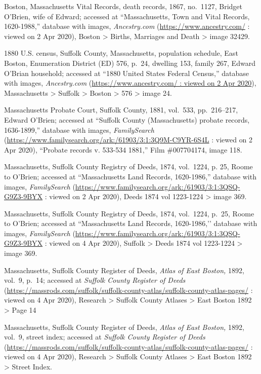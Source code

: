 \begin{thebibliography}{999}
	Boston, Massachusetts Vital Records, death records, 1867, no.\ 1127, Bridget O'Brien, wife of Edward; accessed at ``Massachusetts, Town and Vital Records, 1620-1988,'' database with images, \textit{Ancestry.com} (\url{https://www.ancestry.com/} : viewed on 2 Apr 2020), Boston > Births, Marriages and Death > image 32429.
	
	1880 U.S. census, Suffolk County, Massachusetts, population schedule, East Boston, Enumeration District (ED) 576, p.\ 24, dwelling 153, family 267, Edward O'Brian household; accessed at ``1880 United States Federal Census,'' database with images, \textit{Ancestry.com} (\url{https://www.ancestry.com/ : viewed on 2 Apr 2020}), Massachusetts > Suffolk > Boston > 576 > image 24.
	
	Massachusetts Probate Court, Suffolk County, 1881, vol.\ 533, pp.\ 216--217, Edward O'Brien; accessed at ``Suffolk County (Massachusetts) probate records, 1636-1899,'' database with images, \textit{FamilySearch} (\url{https://www.familysearch.org/ark:/61903/3:1:3Q9M-C9YR-6S4L} : viewed on 2 Apr 2020), ``Probate records v. 533-534 1881,'' Film \#007704174, image 118.
	
	Massachusetts, Suffolk County Registry of Deeds, 1874, vol.\ 1224, p. 25, Roome to O'Brien; accessed at ``Massachusetts Land Records, 1620-1986,'' database with images, \textit{FamilySearch} (\url{https://www.familysearch.org/ark:/61903/3:1:3QSQ-G9Z3-9BYX} : viewed on 2 Apr 2020), Deeds 1874 vol 1223-1224 > image 369.
	
	Massachusetts, Suffolk County Registry of Deeds, 1874, vol.\ 1224, p.\ 25, Roome to O’Brien; accessed at ``Massachusetts Land Records, 1620-1986,’’ database with images, \textit{FamilySearch} (\url{https://www.familysearch.org/ark:/61903/3:1:3QSQ-G9Z3-9BYX} : viewed on 4 Apr 2020), Suffolk > Deeds 1874 vol 1223-1224 > image 369.
	
	Massachusetts, Suffolk County Register of Deeds, \textit{Atlas of East Boston,} 1892, vol.\ 9, p.\ 14; accessed at \textit{Suffolk County Register of Deeds} (\url{https://massrods.com/suffolk/suffolk-county-atlas/suffolk-county-atlas-pages/} : viewed on 4 Apr 2020), Research > Suffolk County Atlases > East Boston 1892 > Page 14
	
	Massachusetts, Suffolk County Register of Deeds, \textit{Atlas of East Boston,} 1892, vol.\ 9, street index; accessed at \textit{Suffolk County Register of Deeds} (\url{https://massrods.com/suffolk/suffolk-county-atlas/suffolk-county-atlas-pages/} : viewed on 4 Apr 2020), Research > Suffolk County Atlases > East Boston 1892 > Street Index.
	

\end{thebibliography}
